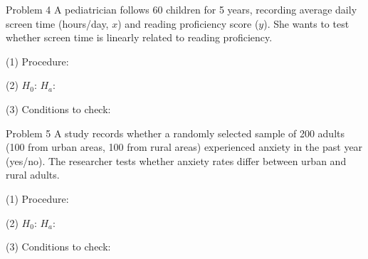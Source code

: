 \documentclass[10pt]{article}
\begin{document}
\begin{notesbox}{Problem 4}
A pediatrician follows 60 children for 5 years, recording average daily screen time
(hours/day, $x$) and reading proficiency score ($y$). She wants to test whether screen
time is linearly related to reading proficiency.

\vspace{0.08in}
(1) Procedure: \blank{9cm}

\vspace{0.08in}
(2) $H_0$: \writeline
$H_a$: \writeline

\vspace{0.08in}
(3) Conditions to check: 
\end{notesbox}

\begin{notesbox}{Problem 5}
A study records whether a randomly selected sample of 200 adults (100 from urban areas,
100 from rural areas) experienced anxiety in the past year (yes/no). The researcher
tests whether anxiety rates differ between urban and rural adults.

\vspace{0.08in}
(1) Procedure: \blank{9cm}

\vspace{0.08in}
(2) $H_0$: \writeline
$H_a$: \writeline

\vspace{0.08in}
(3) Conditions to check: 
\end{notesbox}
\end{document}
